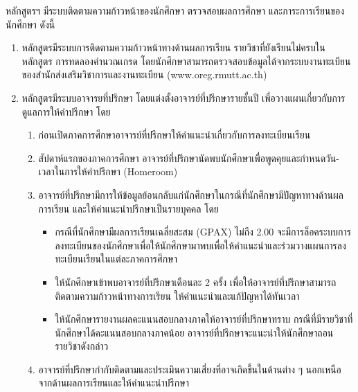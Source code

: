 \begin{doclist}
\end{doclist}



หลักสูตรฯ มีระบบติดตามความก้าวหน้าของนักศึกษา ตรวจสอบผลการศึกษา และภาระการเรียนของนักศึกษา ดังนี้
 \begin{enumerate}
 	\item  หลักสูตรมีระบบการติดตามความก้าวหน้าทางด้านผลการเรียน รายวิชาที่ยังเรียนไม่ครบในหลักสูตร การทดลองคำนวณเกรด โดยนักศึกษาสามารถตรวจสอบข้อมูลได้จากระบบงานทะเบียนของสำนักส่งเสริมวิชาการและงานทะเบียน (www.oreg.rmutt.ac.th) 
 	\item หลักสูตรมีระบบอาจารยที่ปรึกษา โดยแต่งตั้งอาจารย์ที่ปรึกษารายชั้นปี เพื่อวางแผนเกี่ยวกับการดูแลการให้คำปรึกษา โดย
 \begin{enumerate}[label=(\arabic*),leftmargin=0.8cm, labelsep=2mm]
 	\item ก่อนเปิดภาคการศึกษาอาจารย์ที่ปรึกษาให้คำแนะนำเกี่ยวกับการลงทะเบียนเรียน
	\item สัปดาห์แรกของภาคการศึกษา อาจารย์ที่ปรึกษานัดพบนักศึกษาเพื่อพูดคุยและกำหนดวัน-เวลาในการให้คำปรึกษา (Homeroom) 
	\item อาจารย์ที่ปรึกษามีการให้ข้อมูลย้อนกลับแก่นักศึกษาในกรณีที่นักศึกษามีปัญหาทางด้านผลการเรียน และให้คำแนะนำปรึกษาเป็นรายบุคคล โดย
	\begin{itemize}
		\item กรณีที่นักศึกษามีผลการเรียนเฉลี่ยสะสม (GPAX) ไม่ถึง 2.00 จะมีการล็อคระบบการลงทะเบียนของนักศึกษาเพื่อให้นักศึกษามาพบเพื่อให้คำแนะนำและร่วมวางแผนการลงทะเบียนเรียนในแต่ละภาคการศึกษา  
		\item ให้นักศึกษาเข้าพบอาจารย์ที่ปรึกษาเดือนละ 2 ครั้ง เพื่อให้อาจารย์ที่ปรึกษาสามารถติดตามความก้าวหน้าทางการเรียน ให้คำแนะนำและแก้ปัญหาได้ทันเวลา
		\item ให้นักศึกษารายงานผลคะแนนสอบกลางภาคให้อาจารย์ที่ปรึกษาทราบ กรณีที่มีรายวิชาที่นักศึกษาได้คะแนนสอบกลางภาคน้อย อาจารย์ที่ปรึกษาจะแนะนำให้นักศึกษาถอนรายวิชาดังกล่าว 
	\end{itemize}
\item อาจารย์ที่ปรึกษากำกับติดตามและประเมินความเสี่ยงที่อาจเกิดขึ้นในด้านต่าง ๆ นอกเหนือจากด้านผลการเรียนและให้คำแนะนำปรึกษา

\end{enumerate}
\end{enumerate}
